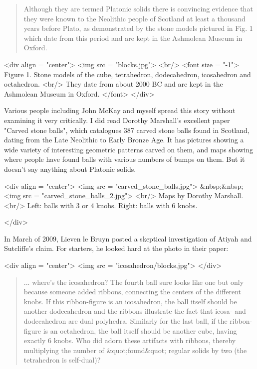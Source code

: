 \begin{quote}
   Although they are termed Platonic solids there is convincing 
   evidence that they were known to the Neolithic people of Scotland 
   at least a thousand years before Plato, as demonstrated by the stone
   models pictured in Fig. 1 which date from this period and are kept 
   in the Ashmolean Museum in Oxford.
\end{quote}
    

<div align = "center">
<img src = "blocks.jpg">
<br/>
<font size = "-1">
Figure 1.  Stone models of the cube, tetrahedron, dodecahedron,
icosahedron and octahedron. <br/> They date from about 2000 BC and are
kept in the Ashmolean Museum in Oxford.
</font>
</div>

Various people including John McKay and myself spread this story without
examining it very critically.  I did read Dorothy Marshall's excellent
paper "Carved stone balls", which catalogues 387 carved stone balls 
found in Scotland, dating from the Late Neolithic to Early Bronze Age.
It has pictures showing a wide variety of interesting geometric 
patterns carved on them, and maps showing where people have found 
balls with various numbers of bumps on them.  But it doesn't say 
anything about Platonic solids.

<div align = "center">
<img src = "carved_stone_balls.jpg">
&nbsp;&nbsp;
<img src = "carved_stone_balls_2.jpg">
<br/>
Maps by Dorothy Marshall. <br/>
Left: balls with 3 or 4 knobs.
Right: balls with 6 knobs.

</div>


In March of 2009, Lieven le Bruyn posted a skeptical investigation of 
Atiyah and Sutcliffe's claim.  For starters, he looked hard at the
photo in their paper:

<div align = "center">
<img src = "icosahedron/blocks.jpg">
</div>

\begin{quote}
   ... where's the icosahedron?  The fourth ball sure looks like one 
   but only because someone added ribbons, connecting the centers of 
  the different knobs.  If this ribbon-figure is an icosahedron, the 
  ball itself should be another dodecahedron and the ribbons illustrate
  the fact that icosa- and dodecahedron are dual polyhedra.  Similarly 
  for the last ball, if the ribbon-figure is an octahedron, the ball 
  itself should be another cube, having exactly 6 knobs.  Who did adorn
  these artifacts with ribbons, thereby multiplying the number of 
  &quot;found&quot; regular solids by two (the tetrahedron is self-dual)? 
\end{quote}
    

